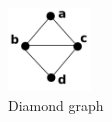  \begin{figure}[htb]	
 \center%
 \includegraphics[width=2.2cm]{./img/diamond.png}
 \caption{Diamond graph}
\label{fig:diamond}
\end{figure}  
 
